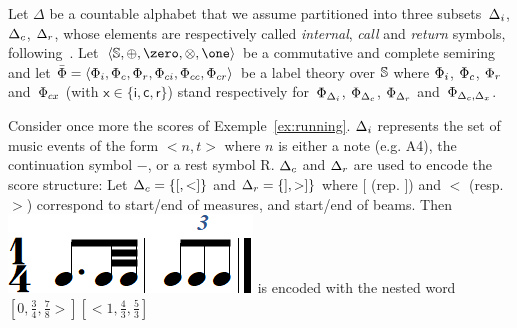\noindent
\label{sec:SWVPA-def}
Let $\Delta$ be a countable alphabet
that we assume partitioned into three
subsets~$\Deltai$, $\Deltac$, $\Deltar$,
whose elements are respectively called
\emph{internal}, \emph{call} and \emph{return} symbols, 
following~\cite{AlurMadhusudan09nested}.
Let~$\< \Semiring, \oplus, \zero, \otimes, \one>$ be a commutative and complete semiring and let
$\bar\Phi = \< \Phii, \Phic, \Phir, \Phici, \Phicc, \Phicr>$
be a label theory over $\mathbb{S}$
where $\Phii$, $\Phic$, $\Phir$ and~$\Phicx$ (with $\mathsf{x} \in \{ \mathsf{i}, \mathsf{c}, \mathsf{r}\}$)
stand respectively
for~$\Phi_\Deltai$, $\Phi_\Deltac$, $\Phi_\Deltar$ and~$\Phi_{\Deltac, \Delta_\mathsf{x}}$.
%

\begin{example}
Consider once more the scores of Exemple~\ref{ex:running}.
$\Deltai$ represents the set of music events of the form $<n, t>$
where $n$ is either a note (e.g. A4), the continuation symbol $-$, or a
rest symbol R. $\Deltac$ and  $\Deltar$ are used to encode the score structure:
Let $\Deltac = \{[, <]\}$ and  $\Deltar = \{], >]\}$ where $[$ (rep. $]$)
and $<$ (resp. $>$) correspond to start/end of measures, and start/end of
beams. Then  \includegraphics[scale=0.20]{pictures/score5.png}
is encoded with the nested word $[0, \frac{3}{4}, \frac{7}{8}>][<1, \frac{4}{3}, \frac{5}{3}]$
\endex
\end{example}



